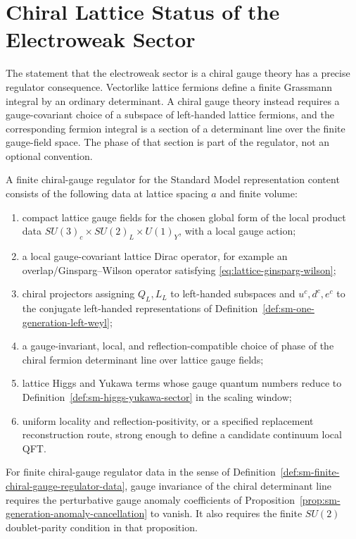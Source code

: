 \section{Chiral Lattice Status of the Electroweak Sector}

The statement that the electroweak sector is a chiral gauge theory has a
precise regulator consequence.  Vectorlike lattice fermions define a finite
Grassmann integral by an ordinary determinant.  A chiral gauge theory instead
requires a gauge-covariant choice of a subspace of left-handed lattice
fermions, and the corresponding fermion integral is a section of a
determinant line over the finite gauge-field space.  The phase of that
section is part of the regulator, not an optional convention.

\begin{definition}
\label{def:sm-finite-chiral-gauge-regulator-data}
A finite chiral-gauge regulator for the Standard Model representation
content consists of the following data at lattice spacing \(a\) and finite
volume:
\begin{enumerate}
\item compact lattice gauge fields for the chosen global form of the local
      product data \(SU(3)_c\times SU(2)_L\times U(1)_Y\), with a local gauge
      action;
\item a local gauge-covariant lattice Dirac operator, for example an
      overlap/Ginsparg--Wilson operator satisfying
      \eqref{eq:lattice-ginsparg-wilson};
\item chiral projectors assigning \(Q_L,L_L\) to left-handed subspaces and
      \(u^c,d^c,e^c\) to the conjugate left-handed representations of
      Definition~\ref{def:sm-one-generation-left-weyl};
\item a gauge-invariant, local, and reflection-compatible choice of phase of
      the chiral fermion determinant line over lattice gauge fields;
\item lattice Higgs and Yukawa terms whose gauge quantum numbers reduce to
      Definition~\ref{def:sm-higgs-yukawa-sector} in the scaling window;
\item uniform locality and reflection-positivity, or a specified replacement
      reconstruction route, strong enough to define a candidate continuum
      local QFT.
\end{enumerate}
\end{definition}

\begin{proposition}
\label{prop:sm-chiral-lattice-anomaly-necessity}
For finite chiral-gauge regulator data in the sense of
Definition~\ref{def:sm-finite-chiral-gauge-regulator-data}, gauge
invariance of the chiral determinant line requires the perturbative gauge
anomaly coefficients of Proposition~\ref{prop:sm-generation-anomaly-cancellation}
to vanish.  It also requires the finite \(SU(2)\) doublet-parity condition in
that proposition.
\end{proposition}

